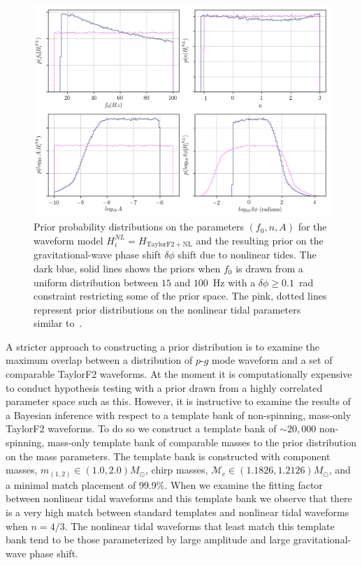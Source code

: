 \begin{figure}[th]
\centering
\includegraphics[width=0.9\columnwidth]{figs/chapter6/all_pg_priors.png}
\caption{Prior probability distributions on the parameters $(f_0, n, A)$ for the waveform model $H^{NL}_i = H_\mathrm{TaylorF2+NL}$ and the resulting prior on the gravitational-wave phase shift $\delta\phi$ shift due to nonlinear tides. The dark blue, solid lines shows the priors when $f_0$ is drawn from a uniform distribution between $15$ and $100$~Hz with a $\delta\phi \ge 0.1$~rad constraint restricting some of the prior space. The pink, dotted lines represent prior distributions on the nonlinear tidal parameters similar to~\cite{abbott2019constraining}.}
\label{fig:priors}
\end{figure}

A stricter approach to constructing a prior distribution is to examine the maximum overlap between a distribution of $p$-$g$ mode waveform and a set of comparable TaylorF2 waveforms. At the moment it is computationally expensive to conduct hypothesis testing with a prior drawn from a highly correlated parameter space such as this. However, it is instructive to examine the results of a Bayesian inference with respect to a template bank of non-spinning, mass-only TaylorF2 waveforms. To do so we construct a template bank of $\sim 20,000$ non-spinning, mass-only template bank of comparable masses to the prior distribution on the mass parameters. The template bank is constructed with component masses, $m_{(1,2)} \in (1.0, 2.0) M_{\odot}$, chirp masses, $\mathcal{M}_c \in (1.1826, 1.2126) M_{\odot}$, and a minimal match placement of 99.9\%. When we examine the fitting factor between nonlinear tidal waveforms and this template bank we observe that there is a very high match between standard templates and nonlinear tidal waveforms when $n = 4/3$. The nonlinear tidal waveforms that least match this template bank tend to be those parameterized by large amplitude and large gravitational-wave phase shift.

